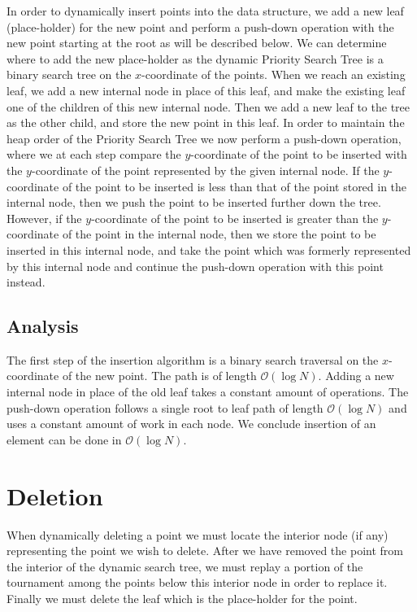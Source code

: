 \documentclass[twoside,11pt,openright]{report}
\begin{document}
In order to dynamically insert points into the data structure, we add a new leaf (place-holder) for the new point and perform a push-down operation with the new point starting at the root as will be described below. We can determine where to add the new place-holder as the dynamic Priority Search Tree is a binary search tree on the $x$-coordinate of the points. When we reach an existing leaf, we add a new internal node in place of this leaf, and make the existing leaf one of the children of this new internal node. Then we add a new leaf to the tree as the other child, and store the new point in this leaf. In order to maintain the heap order of the Priority Search Tree we now perform a push-down operation, where we at each step compare the $y$-coordinate of the point to be inserted with the $y$-coordinate of the point represented by the given internal node. If the $y$-coordinate of the point to be inserted is less than that of the point stored in the internal node, then we push the point to be inserted further down the tree. However, if the $y$-coordinate of the point to be inserted is greater than the $y$-coordinate of the point in the internal node, then we store the point to be inserted in this internal node, and take the point which was formerly represented by this internal node and continue the push-down operation with this point instead.

\subsection*{Analysis}

The first step of the insertion algorithm is a binary search traversal on the $x$-coordinate of the new point. The path is of length $\mathcal{O}(\log N)$. Adding a new internal node in place of the old leaf takes a constant amount of operations. The push-down operation follows a single root to leaf path of length $\mathcal{O}(\log N)$ and uses a constant amount of work in each node. We conclude insertion of an element can be done in $\mathcal{O}(\log N)$.

\section{Deletion}

When dynamically deleting a point we must locate the interior node (if any) representing the point we wish to delete. After we have removed the point from the interior of the dynamic search tree, we must replay a portion of the tournament among the points below this interior node in order to replace it. Finally we must delete the leaf which is the place-holder for the point.
\end{document}
